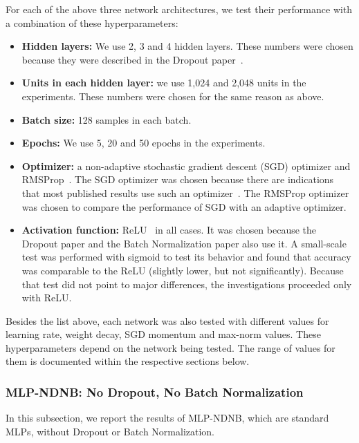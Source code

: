 \documentclass[../dropout-vs-batch-normalization.tex]{subfiles}
\begin{document}

For each of the above three network architectures, we test their performance with a combination of these hyperparameters:

\begin{itemize}
\item \textbf{Hidden layers:} We use 2, 3 and 4 hidden layers. These numbers were chosen because they were described in the Dropout paper~\cite{Srivastava2014}.
\item \textbf{Units in each hidden layer:} we use 1,024 and 2,048 units in the experiments. These numbers were chosen for the same reason as above.
\item \textbf{Batch size:} 128 samples in each batch.
\item \textbf{Epochs:} We use 5, 20 and 50 epochs in the experiments. 
\item \textbf{Optimizer:} a non-adaptive stochastic gradient descent (SGD) optimizer and RMSProp~\cite{Tieleman2012}. The SGD optimizer was chosen because there are indications that most published results use such an optimizer~\cite{Ruder2016}. The RMSProp optimizer was chosen to compare the performance of SGD with an adaptive optimizer.
\item \textbf{Activation function:} ReLU~\cite{Nair2010} in all cases. It was chosen because the Dropout paper \cite{Srivastava2014} and the Batch Normalization paper \cite{Ioffe2015} also use it. A small-scale test was performed with sigmoid to test its behavior and found that accuracy was comparable to the ReLU (slightly lower, but not significantly). Because that test did not point to major differences, the investigations proceeded only with ReLU.
\end{itemize}

Besides the list above, each network was also tested with different values for learning rate, weight decay, SGD momentum and max-norm values. These hyperparameters depend on the network being tested. The range of values for them is documented within the respective sections below.


\medskip
\subsubsection{MLP-NDNB: No Dropout, No Batch Normalization}

In this subsection, we report the results of MLP-NDNB, which are standard MLPs, without Dropout or Batch Normalization.
\end{document}
